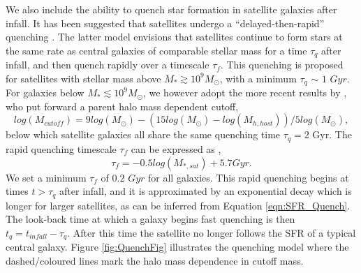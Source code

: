 We also include the ability to quench star formation in satellite galaxies after infall. It has been suggested that satellites undergo a ``delayed-then-rapid'' quenching \citep{Wetzel2013GalaxyUniverse}. The latter model envisions that satellites continue to form stars at the same rate as central galaxies of comparable stellar mass for a time $\tau_q$ after infall, and then quench rapidly over a timescale $\tau_{f}$. This quenching is proposed for satellites with stellar mass above $M_*\gtrsim 10^9 M_{\odot}$, with a minimum $\tau_q$ $\sim$ $1$ $Gyr$. For galaxies below $M_* \lesssim 10^{9} M_{\odot}$, we however adopt the more recent results by \citet{Fillingham2016UnderStripping}, who put forward a parent halo mass dependent cutoff,
\begin{equation}
\label{eqn:Cutoff}
log(M_{cutoff}) = 9 log(M_{\odot}) - (15 log(M_{\odot}) - log(M_{h,host}))/5log(M_{\odot}) ,
\end{equation}
below which satellite galaxies all share the same quenching time $\tau_q=2$ Gyr.
The rapid quenching timescale $\tau_{f}$ can be expressed as \citep{Wetzel2013GalaxyUniverse},
\begin{equation}
\label{eqn:tauf}
\tau_f = -0.5 log(M_{*,sat}) + 5.7 Gyr.
\end{equation}
We set a minimum $\tau_{f}$ of $0.2$ $Gyr$ for all galaxies. This rapid quenching begins at times $t > \tau_q$ after infall, and it is approximated by an exponential decay which is longer for larger satellites, as can be inferred from Equation \ref{eqn:SFR_Quench}. The look-back time at which a galaxy begins fast quenching is then $t_q = t_{infall} - \tau_q$. After this time the satellite no longer follows the SFR of a typical central galaxy. Figure \ref{fig:QuenchFig} illustrates the quenching model where the dashed/coloured lines mark the halo mass dependence in cutoff mass.

